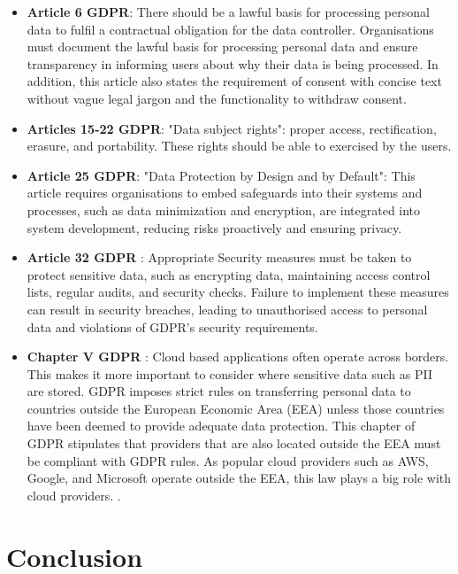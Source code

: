 \begin{itemize}
    \label{section:gdpr}
    \item \textbf{Article 6 GDPR}: There should be a lawful basis for processing personal data to fulfil a contractual obligation for the data controller. Organisations must document the lawful basis for processing personal data and ensure transparency in informing users about why their data is being processed. In addition, this article also states the requirement of consent with concise text without vague legal jargon and the functionality to withdraw consent.
    
    \item \textbf{Articles 15-22 GDPR}: "Data subject rights": proper access, rectification, erasure, and portability. These rights should be able to exercised by the users. 

    \item \textbf{Article 25 GDPR}: "Data Protection by Design and by Default": This article requires organisations to embed safeguards into their systems and processes, such as data minimization and encryption, are integrated into system development, reducing risks proactively and ensuring privacy. 

    \item \textbf{Article 32 GDPR }: Appropriate Security measures must be taken to protect sensitive data, such as encrypting data, maintaining access control lists, regular audits, and security checks. Failure to implement these measures can result in security breaches, leading to unauthorised access to personal data and violations of GDPR’s security requirements.
    
    
    \item \textbf{Chapter V GDPR }: Cloud based applications often operate across borders. This makes it more important to consider where sensitive data such as PII are stored. GDPR imposes strict rules on transferring personal data to countries outside the European Economic Area (EEA) unless those countries have been deemed to provide adequate data protection. This chapter of GDPR stipulates that providers that are also located outside the EEA must be compliant with GDPR rules. As popular cloud providers such as AWS, Google, and Microsoft operate outside the EEA, this law plays a big role with cloud providers.  
.
\end{itemize}

\section{Conclusion}

